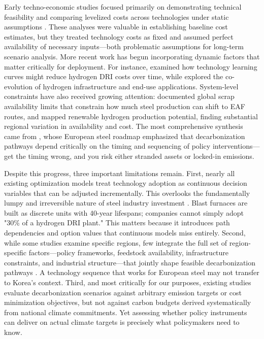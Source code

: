Early techno-economic studies focused primarily on demonstrating technical feasibility and comparing levelized costs across technologies under static assumptions \citep{Vogl2018, Otto2017}. These analyses were valuable in establishing baseline cost estimates, but they treated technology costs as fixed and assumed perfect availability of necessary inputs—both problematic assumptions for long-term scenario analysis. More recent work has begun incorporating dynamic factors that matter critically for deployment. For instance, \citet{prammer2021steel} examined how technology learning curves might reduce hydrogen DRI costs over time, while \citet{ueckerdt2021potential} explored the co-evolution of hydrogen infrastructure and end-use applications. System-level constraints have also received growing attention: \citet{pauliuk2013global} documented global scrap availability limits that constrain how much steel production can shift to EAF routes, and \citet{wang2021hydrogen} mapped renewable hydrogen production potential, finding substantial regional variation in availability and cost. The most comprehensive synthesis came from \citet{MaterialEconomics2019}, whose European steel roadmap emphasized that decarbonization pathways depend critically on the timing and sequencing of policy interventions—get the timing wrong, and you risk either stranded assets or locked-in emissions.

Despite this progress, three important limitations remain. First, nearly all existing optimization models treat technology adoption as continuous decision variables that can be adjusted incrementally. This overlooks the fundamentally lumpy and irreversible nature of steel industry investment \citep{Griffin2020}. Blast furnaces are built as discrete units with 40-year lifespans; companies cannot simply adopt "30\% of a hydrogen DRI plant." This matters because it introduces path dependencies and option values that continuous models miss entirely. Second, while some studies examine specific regions, few integrate the full set of region-specific factors—policy frameworks, feedstock availability, infrastructure constraints, and industrial structure—that jointly shape feasible decarbonization pathways \citep{zhang2022steel}. A technology sequence that works for European steel may not transfer to Korea's context. Third, and most critically for our purposes, existing studies evaluate decarbonization scenarios against arbitrary emission targets or cost minimization objectives, but not against carbon budgets derived systematically from national climate commitments. Yet assessing whether policy instruments can deliver on actual climate targets is precisely what policymakers need to know.

